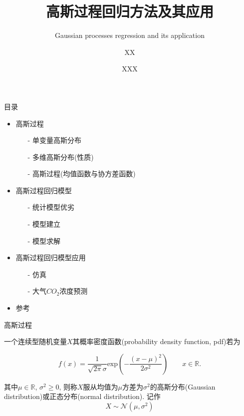 \documentclass[10pt,mathserif]{beamer}
\title{高斯过程回归方法及其应用}
\subtitle{Gaussian processes regression and its application}
\date{XXX}
\author{XX}
\theoremstyle{definition}
\numberwithin{equation}{section} %
\begin{document}
    
    \maketitle %

    \begin{frame}{目录}
        \begin{itemize}
            \item 高斯过程
            \begin{itemize}
                \item[-] 单变量高斯分布
                \item[-] 多维高斯分布(性质)
                \item[-] 高斯过程(均值函数与协方差函数)
            \end{itemize}

            \item 高斯过程回归模型
            \begin{itemize}
                \item[-] 统计模型优劣
                \item[-] 模型建立
                \item[-] 模型求解
            \end{itemize}

            \item 高斯过程回归模型应用
            \begin{itemize}
                \item[-] 仿真
                \item[-] 大气$CO_{2}$浓度预测
            \end{itemize}

            \item 参考
        \end{itemize}
    \end{frame}


    \begin{frame}[fragile]{高斯过程}
        \begin{definition}[高斯分布]
            \vspace{2ex}
            一个连续型随机变量$X$其概率密度函数(probability density function, pdf)若为
            
            \begin{equation}
                f(x)=\frac{1}{\sqrt{2\pi}\sigma}\mathrm{exp}\left(-\frac{(x-\mu)^2}{2\sigma^{2}}\right)\qquad x\in \mathds{R}. 
            \end{equation}

            其中$\mu\in\mathds{R}$, $\sigma^{2}\geqslant 0$, 则称$X$服从均值为$\mu$方差为$\sigma^{2}$的高斯分布(Gaussian distribution)或正态分布(normal distribution). 记作
            $$X\sim\mathcal{N}(\mu, \sigma^{2})$$
        \end{definition}
    \end{frame}
\end{document}

